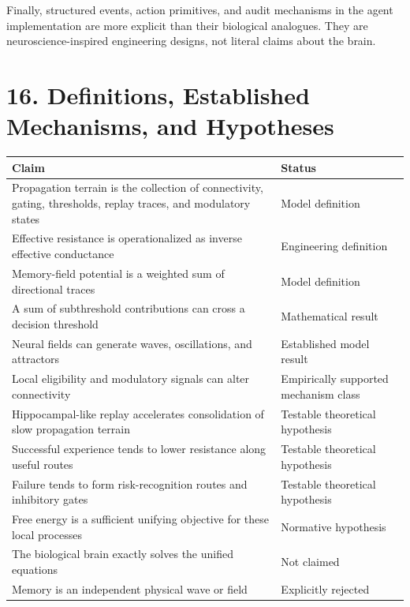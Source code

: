 \documentclass[11pt, a4paper]{article}
\begin{document}
Finally, structured events, action primitives, and audit mechanisms in the agent implementation are more explicit than their biological analogues. They are neuroscience-inspired engineering designs, not literal claims about the brain.


\section{16. Definitions, Established Mechanisms, and Hypotheses}

\begin{center}\begin{tabularx}{\textwidth}{X p{}}\toprule
\textbf{Claim} & \textbf{Status} \\
\midrule
Propagation terrain is the collection of connectivity, gating, thresholds, replay traces, and modulatory states & Model definition \\
Effective resistance is operationalized as inverse effective conductance & Engineering definition \\
Memory-field potential is a weighted sum of directional traces & Model definition \\
A sum of subthreshold contributions can cross a decision threshold & Mathematical result \\
Neural fields can generate waves, oscillations, and attractors & Established model result \\
Local eligibility and modulatory signals can alter connectivity & Empirically supported mechanism class \\
Hippocampal-like replay accelerates consolidation of slow propagation terrain & Testable theoretical hypothesis \\
Successful experience tends to lower resistance along useful routes & Testable theoretical hypothesis \\
Failure tends to form risk-recognition routes and inhibitory gates & Testable theoretical hypothesis \\
Free energy is a sufficient unifying objective for these local processes & Normative hypothesis \\
The biological brain exactly solves the unified equations & Not claimed \\
Memory is an independent physical wave or field & Explicitly rejected \\
\bottomrule\end{tabularx}\end{center}
\end{document}
